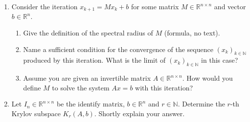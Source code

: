 \vspace*{-0.5cm}
\begin{enumerate}
	\item Consider the iteration $x_{k+1} = Mx_k + b$ for some matrix $M \in \mathbb{R}^{n \times n}$ and vector $b \in \mathbb{R}^n$. 
	\begin{enumerate}
		\item Give the definition of the spectral radius of $M$ (formula, no text).
		\item Name a sufficient condition for the convergence of the sequence $(x_k)_{k\in\mathbb{N}}$ produced by this iteration. What is the limit of $(x_k)_{k\in\mathbb{N}}$ in this case?
		\item Assume you are given an invertible matrix $A \in \mathbb{R}^{n \times n}$. How would you define $M$ to solve the system $Ax=b$ with this iteration?
	\end{enumerate}
	\item Let $I_n \in \mathbb{R}^{n \times n}$ be the identify matrix, $b\in \mathbb{R}^{n}$ and $r\in \mathbb{N}$. Determine the $r$-th Krylov subspace $K_r(A,b)$. Shortly explain your answer.
\end{enumerate}
 